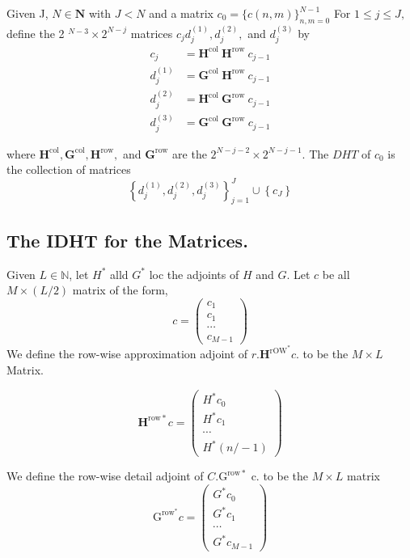 Given J, $N \in \mathbf{N}$ with $J<N$ and a matrix $c_{0}=\{c(n, m)\}_{n, m=0}^{N-1}$
For $1 \leq j \leq J,$ define the 2 $^{N-3} \times 2^{N-j}$ matrices $c_{j} d_{j}^{(1)}, d_{j}^{(2)},$ and $d_{j}^{(3)}$ by
$$
\begin{aligned} c_{j} &=\mathbf{H}^{\text {col }} \mathbf{H}^{\text {row }} c_{j-1} \\ d_{j}^{(1)} &=\mathbf{G}^{\text {col }} \mathbf{H}^{\text {row }} c_{j-1} \\ d_{j}^{(2)} &=\mathbf{H}^{\text {col }} \mathbf{G}^{\text {row }} c_{j-1} \\ d_{j}^{(3)} &=\mathbf{G}^{\text {col }} \mathbf{G}^{\text {row }} c_{j-1} \end{aligned}
$$

where $\mathbf{H}^{\mathrm{col}}, \mathbf{G}^{\mathrm{col}}, \mathbf{H}^{\mathrm{row}},$ and $\mathbf{G}^{\mathrm{row}}$ are the $2^{N-j-2} \times 2^{N-j-1}$. The $D H T$ of $c_{0}$ is the collection of matrices
$$
\left\{d_{j}^{(1)}, d_{j}^{(2)}, d_{j}^{(3)}\right\}_{j=1}^{J} \cup\left\{c_{J}\right\}
$$


\subsection{The IDHT for the Matrices.}

Given $L \in \mathbb{N}$, let $H^{*}$ alld $G^{*}$ loc the adjoints of $H$ and $G$. Let $c$ be
all $M \times(L / 2)$ matrix of the form,
$$
c=\left(\begin{array}{c}{c_{1}} \\ {c_{1}} \\ {\cdots} \\ {c_{M-1}}\end{array}\right)
$$
We define the row-wise approximation adjoint of $r . \mathbf{H}^{\mathrm{rOW}^{*}} c$. to be the $M \times L$ Matrix.

$$
\mathbf{H}^{\mathrm{row} *} c=\left(\begin{array}{c}{H^{*} c_{0}} \\ {H^{*} c_{1}} \\ {\cdots} \\ {H^{*}(n /-1)}\end{array}\right)
$$

We define the row-wise detail adjoint of $C . \mathrm{G}^{\mathrm{row} *}$ c. to be the $M \times L$ matrix
$$
\mathrm{G}^{\mathrm{row}^{*}} c=\left(\begin{array}{c}{G^{*} c_{0}} \\ {G^{*} c_{1}} \\ {\cdots} \\ {G^{*} c_{M-1}}\end{array}\right)
$$

